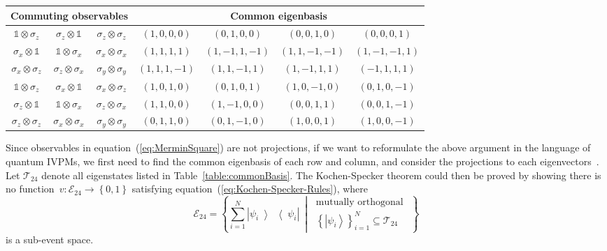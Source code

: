 \documentclass[english,reprint, aps, prl,superscriptaddress, showpacs,
showkeys, longbibliography]{revtex4-1}
\theoremstyle{plain}
\theoremstyle{definition}
\newcommand{\events}{\ensuremath{\mathcal{E}}}
\newcommand{\ket}[1]{{\left\vert{#1}\right\rangle}}
\newcommand{\op}[2]{\ensuremath{\left\vert{#1}\middle\rangle\middle\langle{#2}\right\vert}}
\newcommand{\proj}[1]{\op{#1}{#1}}
\newcommand{\set}[2]{\ensuremath{\left\{ {#1}~\middle|~{#2}\right\} }}
\begin{document}
\begin{table*}
\caption{\label{table:commonBasis}In each row, three observables are listed
in the left column commutes, and their common eigenbasis is listed
in the right column. In order to unify and simplify the notation,
we do not normalize eigenstates, and represent the state~$\alpha_{0}\ket{0}+\alpha_{1}\ket{1}+\alpha_{2}\ket{2}+\alpha_{3}\ket{3}$
as $\left(\alpha_{0},\alpha_{1},\alpha_{2},\alpha_{3}\right)$.}

\begin{ruledtabular}
\begin{tabular}{ccc|cccc}
\multicolumn{3}{c}{Commuting observables} & \multicolumn{4}{c}{Common eigenbasis}\tabularnewline
\hline 
$\mathbb{1}\otimes\sigma_{z}$  & $\sigma_{z}\otimes\mathbb{1}$  & $\sigma_{z}\otimes\sigma_{z}$  & $(1,0,0,0)$  & $(0,1,0,0)$  & $(0,0,1,0)$  & $(0,0,0,1)$ \tabularnewline
$\sigma_{x}\otimes\mathbb{1}$  & $\mathbb{1}\otimes\sigma_{x}$  & $\sigma_{x}\otimes\sigma_{x}$  & $(1,1,1,1)$  & $(1,-1,1,-1)$  & $(1,1,-1,-1)$  & $(1,-1,-1,1)$ \tabularnewline
$\sigma_{x}\otimes\sigma_{z}$  & $\sigma_{z}\otimes\sigma_{x}$  & $\sigma_{y}\otimes\sigma_{y}$  & $(1,1,1,-1)$  & $(1,1,-1,1)$  & $(1,-1,1,1)$  & $(-1,1,1,1)$ \tabularnewline
$\mathbb{1}\otimes\sigma_{z}$  & $\sigma_{x}\otimes\mathbb{1}$  & $\sigma_{x}\otimes\sigma_{z}$  & $(1,0,1,0)$  & $(0,1,0,1)$  & $(1,0,-1,0)$  & $(0,1,0,-1)$ \tabularnewline
$\sigma_{z}\otimes\mathbb{1}$  & $\mathbb{1}\otimes\sigma_{x}$  & $\sigma_{z}\otimes\sigma_{x}$  & $(1,1,0,0)$  & $(1,-1,0,0)$  & $(0,0,1,1)$  & $(0,0,1,-1)$ \tabularnewline
$\sigma_{z}\otimes\sigma_{z}$  & $\sigma_{x}\otimes\sigma_{x}$  & $\sigma_{y}\otimes\sigma_{y}$  & $(0,1,1,0)$  & $(0,1,-1,0)$  & $(1,0,0,1)$  & $(1,0,0,-1)$ \tabularnewline
\end{tabular}
\end{ruledtabular}

\end{table*}

Since observables in equation~(\ref{eq:MerminSquare}) are not projections,
if we want to reformulate the above argument in the language of quantum
IVPMs, we first need to find the common eigenbasis of each row and
column, and consider the projections to each eigenvectors~\cite{Kernaghan1994,peres1995quantum}.
Let $\mathcal{T}_{24}$ denote all eigenstates listed in Table~\ref{table:commonBasis}.
The Kochen-Specker theorem could then be proved by showing there is
no function~$v:\events_{24}\rightarrow\left\{ 0,1\right\} $ satisfying
equation~(\ref{eq:Kochen-Specker-Rules}), where 
\begin{equation}
\events_{24}=\set{\sum_{i=1}^{N}\proj{\psi_{i}}}{\begin{gathered}\textrm{mutually orthogonal }\\
\left\{ \ket{\psi_{i}}\right\} _{i=1}^{N}\subseteq\mathcal{T}_{24}
\end{gathered}
}
\end{equation}
is a sub-event space.
\end{document}
